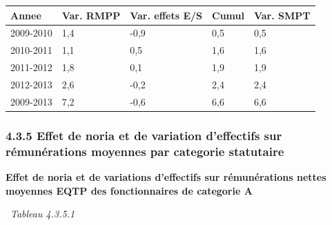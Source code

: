 \begin{longtable}[]{@{}lllll@{}}
\toprule
Annee & Var. RMPP & Var. effets E/S & Cumul & Var. SMPT\tabularnewline
\midrule
\endhead
2009-2010 & 1,4 & -0,9 & 0,5 & 0,5\tabularnewline
2010-2011 & 1,1 & 0,5 & 1,6 & 1,6\tabularnewline
2011-2012 & 1,8 & 0,1 & 1,9 & 1,9\tabularnewline
2012-2013 & 2,6 & -0,2 & 2,4 & 2,4\tabularnewline
2009-2013 & 7,2 & -0,6 & 6,6 & 6,6\tabularnewline
\bottomrule
\end{longtable}

\hypertarget{effet-de-noria-et-de-variation-deffectifs-sur-remunerations-moyennes-par-categorie-statutaire}{%
\subsubsection{4.3.5 Effet de noria et de variation d'effectifs sur
rémunérations moyennes par categorie
statutaire}\label{effet-de-noria-et-de-variation-deffectifs-sur-remunerations-moyennes-par-categorie-statutaire}}

\textbf{Effet de noria et de variations d'effectifs sur rémunérations
nettes moyennes EQTP des fonctionnaires de categorie A}

~\emph{Tableau 4.3.5.1}

